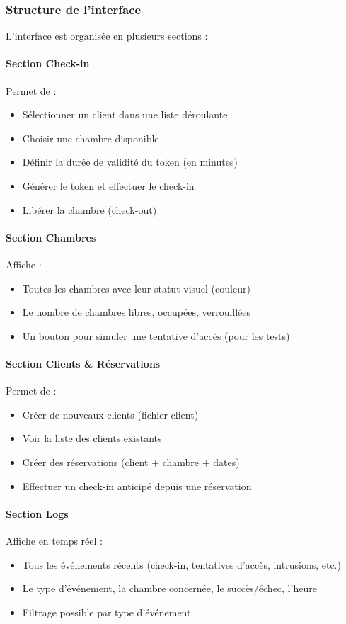 \documentclass[11pt,a4paper]{article}
\begin{document}
\subsubsection{Structure de l'interface}

L'interface est organisée en plusieurs sections :

\paragraph{Section Check-in}
Permet de :
\begin{itemize}
    \item Sélectionner un client dans une liste déroulante
    \item Choisir une chambre disponible
    \item Définir la durée de validité du token (en minutes)
    \item Générer le token et effectuer le check-in
    \item Libérer la chambre (check-out)
\end{itemize}

\paragraph{Section Chambres}
Affiche :
\begin{itemize}
    \item Toutes les chambres avec leur statut visuel (couleur)
    \item Le nombre de chambres libres, occupées, verrouillées
    \item Un bouton pour simuler une tentative d'accès (pour les tests)
\end{itemize}

\paragraph{Section Clients \& Réservations}
Permet de :
\begin{itemize}
    \item Créer de nouveaux clients (fichier client)
    \item Voir la liste des clients existants
    \item Créer des réservations (client + chambre + dates)
    \item Effectuer un check-in anticipé depuis une réservation
\end{itemize}

\paragraph{Section Logs}
Affiche en temps réel :
\begin{itemize}
    \item Tous les événements récents (check-in, tentatives d'accès, intrusions, etc.)
    \item Le type d'événement, la chambre concernée, le succès/échec, l'heure
    \item Filtrage possible par type d'événement
\end{itemize}
\end{document}
